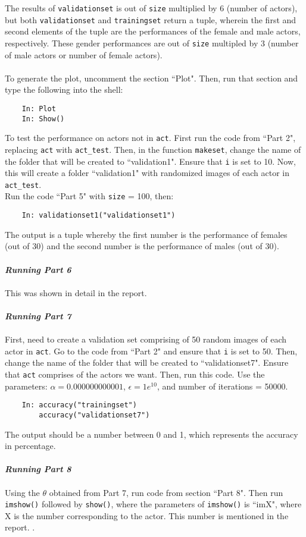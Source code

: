 \documentclass{article}
\begin{document}
The results of \verb|validationset| is out of \verb|size| multiplied by 6 (number of actors), but both \verb|validationset| and \verb|trainingset| return a tuple, wherein the first and second elements of the tuple are the performances of the female and male actors, respectively. These gender performances are out of \verb|size| multipled by 3 (number of male actors or number of female actors).\\
\\
To generate the plot, uncomment the section ``Plot". Then, run that section and type the following into the shell:
\begin{verbatim}
    In: Plot
    In: Show()
\end{verbatim}
To test the performance on actors not in \verb|act|. First run the code from ``Part 2", replacing \verb|act| with \verb|act_test|. Then, in the function \verb|makeset|, change the name of the folder that will be created to ``validation1". Ensure that \verb|i| is set to 10. Now, this will create a folder ``validation1" with randomized images of each actor in \verb|act_test|. \\
Run the code ``Part 5" with \verb|size| = 100, then:
\begin{verbatim}
    In: validationset1("validationset1")
\end{verbatim}
The output is a tuple whereby the first number is the performance of females (out of 30) and the second number is the performance of males (out of 30). 
\\
\\
\noindent \textit{\textbf{Running Part 6}}
\\
\\
This was shown in detail in the report. 
\\
\\
\noindent \textit{\textbf{Running Part 7}}
\\
\\
First, need to create a validation set comprising of 50 random images of each actor in \verb|act|. Go to the code from ``Part 2" and ensure that \verb|i| is set to 50. Then, change the name of the folder that will be created to ``validationset7". Ensure that \verb|act| comprises of the actors we want. Then, run this code. Use the parameters: $\alpha = 0.000000000001$, $\epsilon = 1e^{10}$, and number of iterations = 50000.
\begin{verbatim}
    In: accuracy("trainingset")
        accuracy("validationset7")
\end{verbatim}
The output should be a number between 0 and 1, which represents the accuracy in percentage.
\\
\\
\noindent \textit{\textbf{Running Part 8}}
\\
\\
Using the $\theta$ obtained from Part 7, run code from section ``Part 8". Then run \verb|imshow()| followed by \verb|show()|, where the parameters of \verb|imshow()| is
``imX", where X is the number corresponding to the actor. This number is mentioned in the report. 
.
\end{document}
